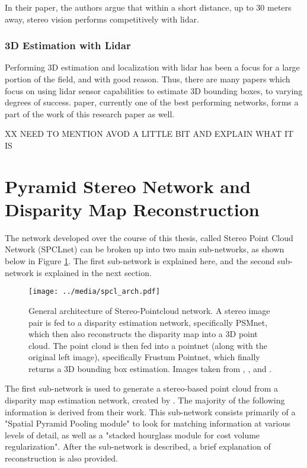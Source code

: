 In their paper, the authors argue that within a short distance, up to 30 meters away, stereo vision performs competitively with lidar.



\subsubsection{3D Estimation with Lidar}
Performing 3D estimation and localization with lidar has been a focus for a large portion of the field, and with good reason. Thus, there are many papers which focus on using lidar sensor capabilities to estimate 3D bounding boxes, to varying degrees of success. \cite{qi_frustum_2017} paper, currently one of the best performing networks, forms a part of the work of this research paper as well.

XX NEED TO MENTION AVOD A LITTLE BIT AND EXPLAIN WHAT IT IS

\newpage
\section{Pyramid Stereo Network and Disparity Map Reconstruction} %
The network developed over the course of this thesis, called Stereo Point Cloud Network (SPCLnet) can be broken up into two main sub-networks, as shown below in Figure \ref{spcl_arch}. The first sub-network is explained here, and the second sub-network is explained in the next section.



\begin{figure}[ht]
	\centering
	\texttt{[image: ../media/spcl\_arch.pdf]}
	\caption{General architecture of Stereo-Pointcloud network. A stereo image pair is fed to a disparity estimation network, specifically PSMnet, which then also reconstructs the disparity map into a 3D point cloud. The point cloud is then fed into a pointnet (along with the original left image), specifically Frustum Pointnet, which finally returns a 3D bounding box estimation. Images taken from \cite{geiger_are_2012}, \cite{chang_pyramid_2018}, and \cite{qi_frustum_2017}.}
	\label{spcl_arch}
\end{figure}

The first sub-network is used to generate a stereo-based point cloud from a disparity map estimation network, created by \cite{chang_pyramid_2018}. The majority of the following information is derived from their work. This sub-network consists primarily of a "Spatial Pyramid Pooling module" to look for matching information at various levels of detail, as well as a "stacked hourglass module for cost volume regularization". After the sub-network is described, a brief explanation of reconstruction is also provided. 

